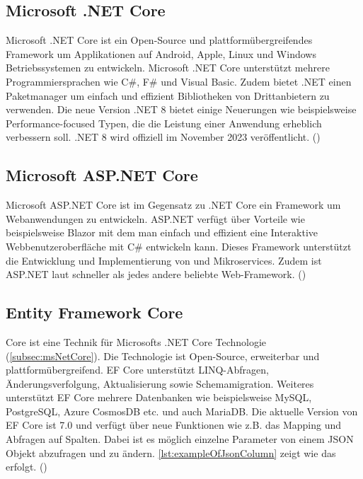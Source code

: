 \documentclass[a4paper, fontsize=11pt, parskip=half, twoside]{scrreprt}
\begin{document}
	\subsection{Microsoft .NET Core} \label{subsec:msNetCore}
	Microsoft .NET Core ist ein Open-Source und plattformübergreifendes Framework um Applikationen auf Android, Apple, Linux und Windows Betriebssystemen zu entwickeln.
	Microsoft .NET Core unterstützt mehrere Programmiersprachen wie C\#, F\# und Visual Basic.
	Zudem bietet .NET einen Paketmanager um einfach und effizient Bibliotheken von Drittanbietern zu verwenden.
	Die neue Version .NET 8 bietet einige Neuerungen wie beispielsweise Performance-focused Typen, die die Leistung einer Anwendung erheblich verbessern soll.
	.NET 8 wird offiziell im November 2023 veröffentlicht. (\textcite{billwagner_net_nodate})

	\subsection{Microsoft ASP.NET Core}
	Microsoft ASP.NET Core ist im Gegensatz zu .NET Core ein Framework um Webanwendungen zu entwickeln. 
	ASP.NET verfügt über Vorteile wie beispielsweise Blazor mit dem man einfach und effizient eine Interaktive Webbenutzeroberfläche mit C\# entwickeln kann.
	Dieses Framework unterstützt die Entwicklung und Implementierung von  und Mikroservices.
	Zudem ist ASP.NET laut \textcite{noauthor_techempower_nodate} schneller als jedes andere beliebte Web-Framework. (\textcite{billwagner_net_nodate})
	
	\subsection{Entity Framework Core}
	 Core ist eine  Technik für Microsofts .NET Core Technologie (\autoref{subsec:msNetCore}). 
	Die Technologie ist Open-Source, erweiterbar und plattformübergreifend.
	\ac{EF} Core unterstützt LINQ-Abfragen, Änderungsverfolgung, Aktualisierung sowie Schemamigration.
	Weiteres unterstützt \ac{EF} Core mehrere Datenbanken wie beispielsweise MySQL, PostgreSQL, Azure CosmosDB etc. und auch MariaDB.
	Die aktuelle Version von \ac{EF} Core ist 7.0 und verfügt über neue Funktionen wie z.B. das Mapping und Abfragen auf  Spalten. 
	Dabei ist es möglich einzelne Parameter von einem \ac{JSON} Objekt abzufragen und zu ändern. 
	\autoref{lst:exampleOfJsonColumn} zeigt wie das erfolgt. (\textcite{billwagner_net_nodate})
	
\end{document}
